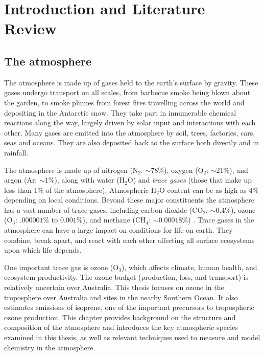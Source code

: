 \chapter{Introduction and Literature Review} %
\label{LR}

\section{The atmosphere}
\label{LR:Atmos}
  The atmosphere is made up of gases held to the earth's surface by gravity. 
  These gases undergo transport on all scales, from barbecue smoke being blown about the garden, to smoke plumes from forest fires travelling across the world and depositing in the Antarctic snow.
  They take part in innumerable chemical reactions along the way, largely driven by solar input and interactions with each other.
  Many gases are emitted into the atmosphere by soil, trees, factories, cars, seas and oceans.
  They are also deposited back to the surface both directly and in rainfall.
  
  The atmosphere is made up of nitrogen (N$_2$: $\sim 78\%$), oxygen (O$_2$: 
  $\sim 21\%$), and argon (Ar: $\sim 1\%$), along with water (H$_2$O) and 
  \textit{trace gases} (those that make up less than 1\% of the atmosphere).
  Atmospheric H$_2$O content can be as high as $4\%$ depending on local 
  conditions.
  Beyond these major constituents the atmosphere has a vast number of trace 
  gases, including carbon dioxide (CO$_2$: $\sim 0.4\%$), ozone (O$_3$: 
  $.000001\%$ to $0.001\%$), and methane (CH$_4$: $\sim 0.00018\%$) 
  \parencite[][Ch. 2]{NOAAch4,BrasseurJacob2017}.
  Trace gases in the atmosphere can have a large impact on conditions for life on earth.
  They combine, break apart, and react with each other affecting all surface ecosystems upon which life depends.
  
  One important trace gas is ozone (O$_3$), which affects climate, human health, and ecosystem productivity.
  The ozone budget (production, loss, and transport) is relatively uncertain 
  over Australia.
  This thesis focuses on ozone in the troposphere over Australia and sites in 
  the nearby Southern Ocean.
  It also estimates emissions of isoprene, one of the important precursors to tropospheric ozone production.
  This chapter provides background on the structure and composition of the 
  atmosphere and introduces the key atmospheric species examined in this 
  thesis, as well as relevant techniques used to measure and model chemistry in 
  the atmosphere.
  
